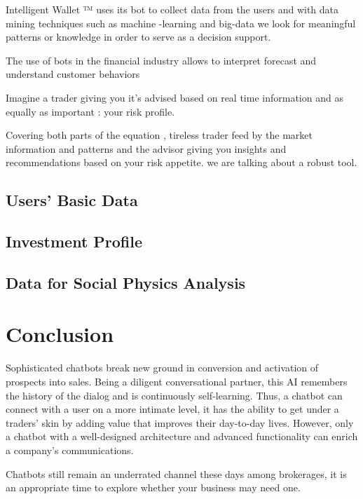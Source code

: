 \documentclass[	DIV=calc,%
							paper=letter,%
							fontsize=12pt%
                            ]{scrartcl}	 					%
\begin{document}
Intelligent Wallet ™  uses its bot to collect data from the users and with data mining techniques such as machine -learning and big-data   we look for meaningful  patterns or knowledge in order to serve as a decision support.

The use of bots in the financial industry allows to interpret forecast and understand customer behaviors 

Imagine a trader giving you it's advised based on real time information and as equally as important : your risk profile.

Covering both parts of the equation , tireless trader feed by the market information and patterns and the advisor giving you insights and recommendations based on your risk appetite. we are talking about a robust tool.

\subsection{\label{sec:level1}Users' Basic Data}
\subsection{\label{sec:level1}Investment Profile}
\subsection{\label{sec:level1}Data for Social Physics Analysis}

\section{\label{sec:level1}Conclusion}
Sophisticated chatbots break new ground in conversion and activation of prospects into sales. Being a diligent conversational partner, this AI remembers the history of the dialog and is continuously self-learning. Thus, a chatbot can connect with a user on a more intimate level, it has the ability to get under a traders’ skin by adding value that improves their day-to-day lives. However, only a chatbot with a well-designed architecture and advanced functionality can enrich a company’s communications. 

Chatbots still remain an underrated channel these days among brokerages, it is an appropriate time to explore whether your business may need one.
\newpage


\end{document}
